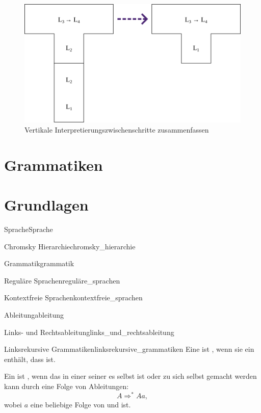 \begin{figure}[H]
  \centering
  \includegraphics[width=0.5\linewidth]{./figures/summarize_interpreter.png}
  \caption{Vertikale Interpretierungszwischenschritte zusammenfassen}
  \label{fig:t_diagram_vertikal_zusammenfassen}
\end{figure}

\section{Grammatiken}
\section{Grundlagen}
\begin{Definition}{Sprache}{Sprache}
\end{Definition}
\begin{Definition}{Chromsky Hierarchie}{chromsky_hierarchie}
\end{Definition}
\begin{Definition}{Grammatik}{grammatik}
\end{Definition}
\begin{Definition}{Reguläre Sprachen}{reguläre_sprachen}
\end{Definition}
\begin{Definition}{Kontextfreie Sprachen}{kontextfreie_sprachen}
\end{Definition}
\begin{Definition}{Ableitung}{ableitung}
\end{Definition}
\begin{Definition}{Links- und Rechtsableitung}{links_und_rechtsableitung}
\end{Definition}
\begin{Definition}{Linksrekursive Grammatiken}{linksrekursive_grammatiken}
Eine  ist , wenn sie ein   enthält, dass  ist.

Ein  ist  , wenn das  in einer seiner  es selbst ist oder zu sich selbst gemacht werden kann durch eine Folge von Ableitungen:
\begin{equation*}
  A \Rightarrow^{*} Aa,
\end{equation*}
wobei $a$ eine beliebige Folge von  und  ist.
\end{Definition}
